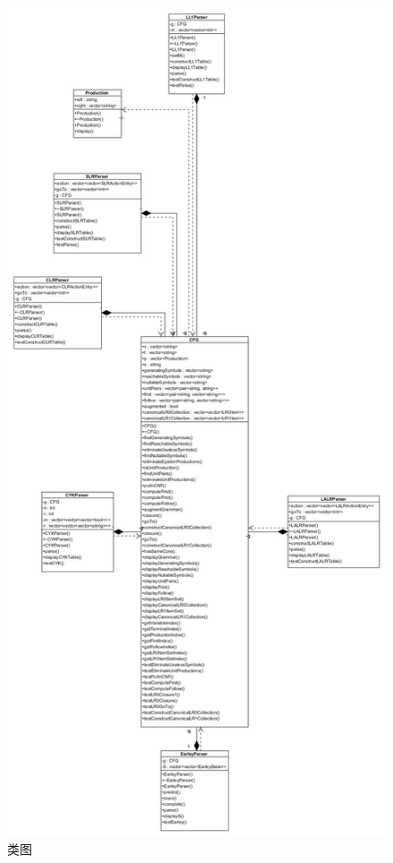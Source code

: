 \documentclass{beamer}
\begin{document}
   \begin{frame}
\begin{figure}
\includegraphics[height=0.8\textheight]{ClassDiagram.jpg}
\caption{类图}
\label{fig: class}
\end{figure}
 \end{frame}
 
\end{document}
